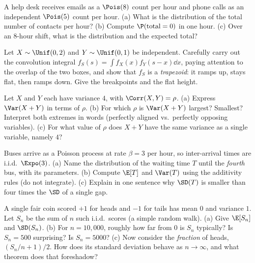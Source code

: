 \begin{exercise}
\label{ch17:ex-pois}
A help desk receives emails as a $\Pois(8)$ count per hour and phone calls
as an independent $\Pois(5)$ count per hour.
(a) What is the distribution of the total number of contacts per hour?
(b) Compute $\P(\text{total}=0)$ in one hour.
(c) Over an $8$-hour shift, what is the distribution and the expected total?
\end{exercise}

\begin{exercise}
\label{ch17:ex-unif}
Let $X\sim\Unif(0,2)$ and $Y\sim\Unif(0,1)$ be independent. Carefully
carry out the convolution integral
$f_S(s)=\int f_X(x)f_Y(s-x)\dd x$, paying attention to the overlap of the
two boxes, and show that $f_S$ is a \emph{trapezoid}: it ramps up, stays
flat, then ramps down. Give the breakpoints and the flat height.
\end{exercise}

\begin{exercise}
\label{ch17:ex-cov}
Let $X$ and $Y$ each have variance $4$, with $\Corr(X,Y)=\rho$.
(a) Express $\Var(X+Y)$ in terms of $\rho$.
(b) For which $\rho$ is $\Var(X+Y)$ largest? Smallest? Interpret both
extremes in words (perfectly aligned vs.\ perfectly opposing variables).
(c) For what value of $\rho$ does $X+Y$ have the same variance as a single
variable, namely $4$?
\end{exercise}

\begin{exercise}
\label{ch17:ex-erlang}
Buses arrive as a Poisson process at rate $\beta=3$ per hour, so
inter-arrival times are i.i.d.\ $\Expo(3)$.
(a) Name the distribution of the waiting time $T$ until the \emph{fourth}
bus, with its parameters.
(b) Compute $\E[T]$ and $\Var(T)$ using the additivity rules (do not
integrate).
(c) Explain in one sentence why $\SD(T)$ is smaller than four times the
$\SD$ of a single gap.
\end{exercise}

\begin{exercise}
\label{ch17:ex-sqrtn}
A single fair coin scored $+1$ for heads and $-1$ for tails has mean $0$
and variance $1$. Let $S_n$ be the sum of $n$ such i.i.d.\ scores (a simple
random walk).
(a) Give $\E[S_n]$ and $\SD(S_n)$.
(b) For $n=10{,}000$, roughly how far from $0$ is $S_n$ typically? Is
$S_n=500$ surprising? Is $S_n=5000$?
(c) Now consider the \emph{fraction} of heads, $(S_n/n + 1)/2$. How does
its standard deviation behave as $n\to\infty$, and what theorem does that
foreshadow?
\end{exercise}

